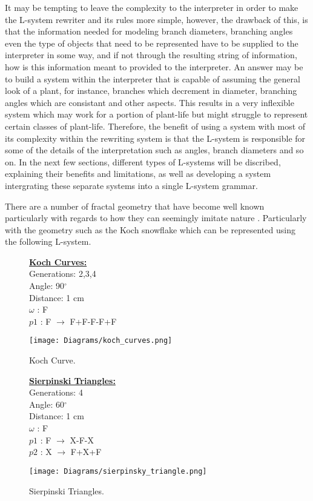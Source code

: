 It may be tempting to leave the complexity to the interpreter in order to make the L-system rewriter and its rules more simple, however, the drawback of this, is that the information needed for modeling branch diameters, branching angles even the type of objects that need to be represented have to be supplied to the interpreter in some way, and if not through the resulting string of information, how is this information meant to provided to the interpreter. An answer may be to build a system within the interpreter that is capable of assuming the general look of a plant, for instance, branches which decrement in diameter, branching angles which are consistant and other aspects. This results in a very inflexible system which may work for a portion of plant-life but might struggle to represent certain classes of plant-life. Therefore, the benefit of using a system with most of its complexity within the rewriting system is that the L-system is responsible for some of the details of the interpretation such as angles, branch diameters and so on. In the next few sections, different types of L-systems will be discribed, explaining their benefits and limitations, as well as developing a system intergrating these separate systems into a single L-system grammar.   

There are a number of fractal geometry that have become well known particularly with regards to how they can seemingly imitate nature \cite{mandelbrot1982fractal}. Particularly with the geometry such as the Koch snowflake which can be represented using the following L-system.

\begin{figure}[htbp]
	\raggedright
	\textbf{\underline{Koch Curves:}} \\
	Generations: 2,3,4 \\
	Angle: 90$^\circ$\\
	Distance: 1 cm\\
	$\omega$ : F \\
	$p1$ : F $\rightarrow$ F+F-F-F+F\\
	{\centering
		\vspace{7px}
		\texttt{[image: Diagrams/koch\_curves.png]}
		\caption{Koch Curve.}
	}
\end{figure}
\begin{figure}[htbp]
	\raggedright
	\textbf{\underline{Sierpinski Triangles:}} \\
	Generations: 4\\
	Angle: 60$^\circ$\\
	Distance: 1 cm\\
	$\omega$ : F\\
	$p1$ : F $\rightarrow$ X-F-X\\
	$p2$ : X $\rightarrow$ F+X+F\\
	{\centering
		\vspace{7px}
		\texttt{[image: Diagrams/sierpinsky\_triangle.png]}
		\caption{Sierpinski Triangles.}
	}
\end{figure}

